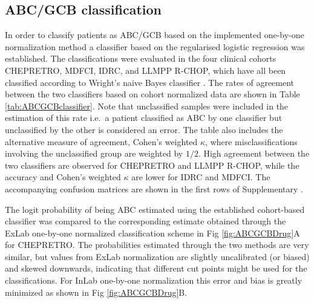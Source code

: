 \documentclass[10pt,letterpaper]{article}
\begin{document}
\subsection*{ABC/GCB classification}
In order to classify patients as ABC/GCB based on the implemented one-by-one normalization method a classifier based on the regularised logistic regression was established.
The classifications were evaluated in the four clinical cohorts CHEPRETRO, MDFCI, IDRC, and LLMPP R-CHOP, which have all been classified according to Wright's naive Bayes classifier \cite{DybkaerBoegsted2015,Wright2003,Lenz2008a}.
The rates of agreement between the two classifiers based on cohort normalized data are shown in Table \ref{tab:ABCGCBclassifier}. Note that unclassified samples were included in the estimation of this rate i.e.\ a patient classified as ABC by one classifier but unclassified by the other is considered an error.
The table also includes the alternative measure of agreement, Cohen's weighted $\kappa$, where misclassifications involving the unclassified group are weighted by $1/2$. High agreement between the two classifiers are observed for CHEPRETRO and LLMPP R-CHOP, while the accuracy and Cohen's weighted $\kappa$ are lower for IDRC and MDFCI.
The accompanying confusion matrices are shown in the first rows of Supplementary .

The logit probability of being ABC estimated using the established cohort-based classifier was compared to the corresponding estimate obtained through the ExLab one-by-one normalized classification scheme in Fig \ref{fig:ABCGCBDrug}A for CHEPRETRO.
The probabilities estimated through the two methods are very similar, but
values from ExLab normalization are slightly uncalibrated (or biased) and skewed downwards, indicating that different cut points might be used for the classifications.
For InLab one-by-one normalization this error and bias is greatly minimized as shown in Fig \ref{fig:ABCGCBDrug}B.
\end{document}
